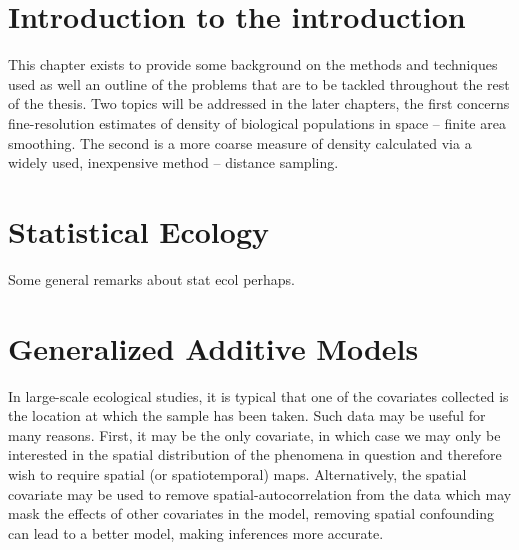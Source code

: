 \label{chap-intro}

\section{Introduction to the introduction}

This chapter exists to provide some background on the methods and techniques used as well an outline of the problems that are to be tackled throughout the rest of the thesis. Two topics will be addressed in the later chapters, the first concerns fine-resolution estimates of density of biological populations in space -- finite area smoothing. The second is a more coarse measure of density calculated via a widely used, inexpensive method -- distance sampling.

\section{Statistical Ecology}

Some general remarks about stat ecol perhaps.

\section{Generalized Additive Models}

In large-scale ecological studies, it is typical that one of the covariates collected is the location at which the sample has been taken. Such data may be useful for many reasons. First, it may be the only covariate, in which case we may only be interested in the spatial distribution of the phenomena in question and therefore wish to require spatial (or spatiotemporal) maps. Alternatively, the spatial covariate may be used to remove spatial-autocorrelation from the data which may mask the effects of other covariates in the model, removing spatial confounding can lead to a better model, making inferences more accurate.

